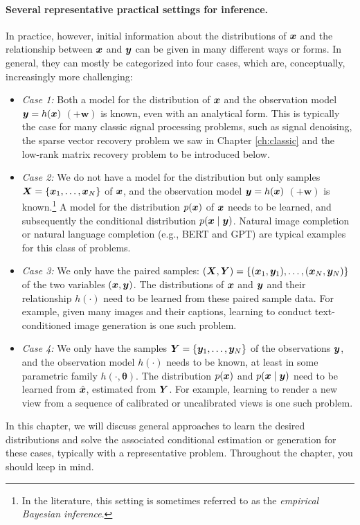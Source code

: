 \documentclass[../../book-main.tex]{subfiles}
\begin{document}
\paragraph{Several representative practical settings for inference.} 
In practice, however, initial information about the distributions of $\bm{x}$ and the relationship between $\bm{x}$ and $\bm{y}$ can be given in many different ways or forms. In general, they can mostly be categorized into four cases, which are, conceptually, increasingly more challenging:
\begin{itemize}
\item {\em Case 1:} Both a model for the distribution of $\bm{x}$ and the observation model $\bm{y} = h(\bm{x})$ $(+ \boldsymbol{w})$ is known, even with an analytical form. This is typically the case for many classic signal processing problems, such as signal denoising, the sparse vector recovery problem we saw in Chapter \ref{ch:classic} and the low-rank matrix recovery problem to be introduced below.
\item {\em Case 2:} We do not have a model for the distribution but only samples $\bm{X} = \{\bm{x}_1, \ldots, \bm{x}_N\}$ of $\bm{x}$, and the observation model $\bm{y} = h(\bm{x})$ $ (+ \boldsymbol{w})$ is known.\footnote{In the literature, this setting is sometimes referred to as the {\em empirical Bayesian inference}.} A model for the distribution $p(\bm{x})$ of $\bm{x}$ needs to be learned, and subsequently the conditional distribution $p(\bm{x}\mid \bm{y})$. Natural image completion or natural language completion (e.g., BERT and GPT) are  typical examples for this class of problems.
\item {\em Case 3:} We only have the paired samples: $(\bm{X}, \bm{Y}) = \{ (\bm{x}_1, \bm{y}_1), \ldots, (\bm{x}_N, \bm{y}_N) \}$ of the two variables  $(\bm{x}, \bm{y})$. The distributions of $\bm{x}$ and $\bm{y}$ and their relationship $h(\cdot)$ need to be learned from these paired sample data. For example, given many images and their captions, learning to conduct text-conditioned image generation is one such problem. 
\item {\em Case 4:} We only have the samples $\bm{Y} = \{\bm{y}_1, \ldots, \bm{y}_N\}$ of the observations $\bm{y}$, and the observation model $h(\cdot)$ needs to be known, at least in some parametric family $h(\cdot, \boldsymbol{\theta})$. The distribution $p(\bm{x})$ and $p(\bm{x} \mid \bm{y})$ need to be learned from $\hat {\bm{x}}$, estimated from $\bm{Y}$. For example, learning to render a new view from a sequence of calibrated or uncalibrated views is one such problem.
\end{itemize}
In this chapter, we will discuss general approaches to learn the desired distributions and solve the associated conditional estimation or generation for these cases, typically with a representative problem.  Throughout the chapter, you should keep  in mind.
\end{document}
